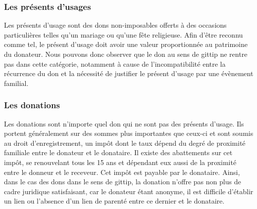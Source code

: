             \subsubsection{Les présents d'usages}
                Les présents d'usage sont des dons non-imposables offerts à des
                occasions particulières telles qu'un mariage ou qu'une fête
                religieuse.
                Afin d'être reconnu comme tel, le présent d'usage doit avoir une 
                valeur proportionnée au patrimoine du donateur.
                Nous pouvons donc observer que le don au sens de gittip ne rentre
                pas dans cette catégorie, notamment à cause de l'incompatibilité
                entre la récurrence du don et la nécessité de justifier
                le présent d'usage par une évènement familial.

            \subsubsection{Les donations}
                Les donations sont n'importe quel don qui ne sont pas des présents
                d'usage. Ils portent généralement sur des sommes plus importantes
                que ceux-ci et sont soumis au droit d'enregistrement, un impôt
                dont le taux dépend du degré de proximité familiale entre le
                donateur et le donataire.
                Il existe des abattements sur cet impôt, se renouvelant tous
                les 15 ans et dépendant eux aussi de la proximité entre le
                donneur et le receveur. Cet impôt est payable par le donataire.
                Ainsi, dans le cas des dons dans le sens de gittip, la donation
                n'offre pas non plus de cadre juridique satisfaisant, car le 
                donateur étant anonyme, il est difficile d'établir un lien ou 
                l'absence d'un lien de parenté entre ce dernier et le donataire.

